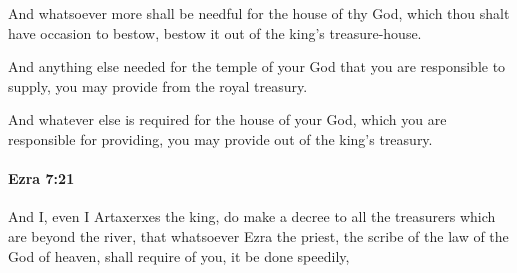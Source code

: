 			\begin{versebox}
					\item[BHS] 
					\item[LXX] 
					\item[ASV] And whatsoever more shall be needful for the house of thy God, which thou shalt have occasion to bestow, bestow it out of the king's treasure-house.
					\item[NIV] And anything else needed for the temple of your God that you are responsible to supply, you may provide from the royal treasury.
					\item[NRSV] And whatever else is required for the house of your God, which you are responsible for providing, you may provide out of the king’s treasury.
			\end{versebox}

		\paragraph{Ezra 7:21} %
			\label{EZRA-7-21}

			And I, even I Artaxerxes the king, do make a decree to all the treasurers which are beyond the river, that whatsoever Ezra the priest, the scribe of the law of the God of heaven, shall require of you, it be done speedily,

